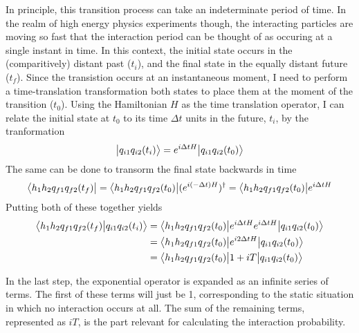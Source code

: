     In principle, this transition process can take an indeterminate period of time.
    In the realm of high energy physics experiments though,
        the interacting particles are moving so fast that the interaction period can be thought of as occuring at a single instant in time.
    In this context, the initial state occurs in the (comparitively) distant past ($t_i$), and the final state in the equally distant future ($t_f$).
    Since the transistion occurs at an instantaneous moment,
        I need to perform a time-translation transformation both states to place them at the moment of the transition ($t_0$).
    Using the Hamiltonian $H$ as the time translation operator,
        I can relate the initial state at $t_0$ to its time $\Delta t$ units in the future, $t_i$, by the tranformation
    \begin{equation}
        \big| q_{i1} q_{i2} (t_i) \big> = e^{i\Delta tH}\big| q_{i1} q_{i2} (t_0) \big>
    \end{equation}
    The same can be done to transorm the final state backwards in time
    \begin{equation}
        \big< h_1 h_2 q_{f1} q_{f2} (t_f) \big|
        = \big< h_1 h_2 q_{f1} q_{f2} (t_0) \big| (e^{i(-\Delta t)H})^\dag
        = \big< h_1 h_2 q_{f1} q_{f2} (t_0) \big| e^{i\Delta tH}
    \end{equation}
    Putting both of these together yields
    \begin{equation} \begin{split}
        \big<  h_1 h_2 q_{f1} q_{f2} (t_f) \big| q_{i1} q_{i2} (t_i) \big>
        &= \big<  h_1 h_2 q_{f1} q_{f2} (t_0) \big| e^{i\Delta tH} e^{i\Delta tH} \big| q_{i1} q_{i2} (t_0) \big>
        \\&= \big<  h_1 h_2 q_{f1} q_{f2} (t_0) \big| e^{i2\Delta tH} \big| q_{i1} q_{i2} (t_0) \big>
        \\&= \big<  h_1 h_2 q_{f1} q_{f2} (t_0) \big| 1 + iT \big| q_{i1} q_{i2} (t_0) \big>
    \end{split} \end{equation}

    In the last step, the exponential operator is expanded as an infinite series of terms.
    The first of these terms will just be 1, corresponding to the static situation in which no interaction occurs at all.
    The sum of the remaining terms, represented as $iT$, is the part relevant for calculating the interaction probability.


    




